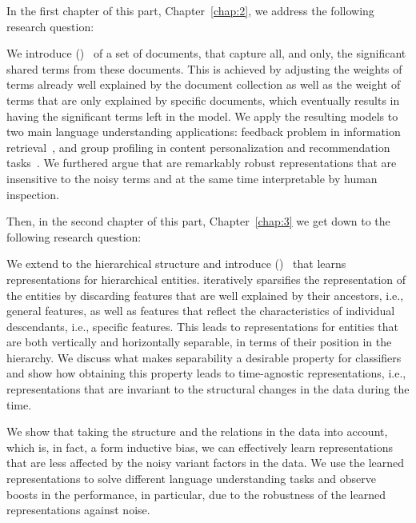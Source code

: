In the first chapter of this part, Chapter~\ref{chap:2}, we address the following research question:

We introduce \emph{\swlms} (\acswlm)~\citep{Dehghani:2016:SIGIR} of a set of documents, that capture all, and only, the significant shared terms from these documents.  This is achieved by adjusting the weights of terms already well explained by the document collection as well as the weight of terms that are only explained by specific documents, which eventually results in having the significant terms left in the model. 
We apply the resulting models to two main language understanding applications: feedback problem in information retrieval~\citep{Dehghani:CIKM2016:long, Dehghani:CIKM2016:short}, and group profiling in content personalization and recommendation tasks~\citep{Dehghani:2016:CHIIR,Dehghani2016:trec}. We furthered argue that \acswlm are remarkably robust representations that are insensitive to the noisy terms and at the same time interpretable by human inspection. 

Then, in the second chapter of this part, Chapter~\ref{chap:3} we get down to the following research question:

We extend \emph{\swlms} to the hierarchical structure and introduce \emph{\hswlms} (\achswlm)~\citep{Dehghani:2016:ICTIR, Dehghani:2016:CLEF} that learns representations for hierarchical entities. \achswlm iteratively sparsifies the representation of the entities by discarding features that are well explained by their ancestors, i.e., general features, as well as features that reflect the characteristics of individual descendants, i.e., specific features. This leads to representations for entities that are both vertically and horizontally separable, in terms of their position in the hierarchy. We discuss what makes separability a desirable property for classifiers and show how obtaining this property leads to time-agnostic representations, i.e., representations that are invariant to the structural changes in the data during the time.

\medskip
We show that taking the structure and the relations in the data into account, which is, in fact, a form inductive bias, we can effectively learn representations that are less affected by the noisy variant factors in the data. We use the learned representations to solve different language understanding tasks and observe boosts in the performance, in particular, due to the robustness of the learned representations against noise.


